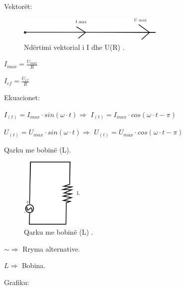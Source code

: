 \documentclass[twocolumn]{article}
\begin{document}
	\begin{center}
		Vektorët:
	\end{center}
	\begin{figure}[h]
		\includegraphics[width=70mm]{Imazhet/Vektor R.png}
		\caption{Ndërtimi vektorial i I dhe U(R) .}
		\label{fig:boat1}
	\end{figure}
	
	$I_{max}= \frac{U_{max}}{R}$
	
	$I_{ef}= \frac{U_{ef}}{R}$
	
	\begin{center}
		Ekuacionet:
	\end{center}
	
	$I_{(t)} = I_{max} \cdot sin (\omega\cdot t) \Rightarrow $ $I_{(t)} = I_{max} \cdot cos (\omega\cdot t- \pi)$
	
	
	$U_{(t)} = U_{max} \cdot sin (\omega\cdot t) \Rightarrow $ $U_{(t)} = U_{max} \cdot cos (\omega\cdot t- \pi)$\\
	
	\begin{center}
		Qarku me bobinë (L).
	\end{center}
	
	\begin{figure}[h]
		\includegraphics[width=30mm]{Imazhet/Qarku L.png}
		\caption{Qarku me bobinë (L) .}
		\label{fig:boat1}
	\end{figure}
	
	
	
	
	$ \sim \Rightarrow $ Rryma alternative.
	
	$L \Rightarrow $ Bobina.
	
	\begin{center}
		Grafiku:
	\end{center}
	
\end{document}
